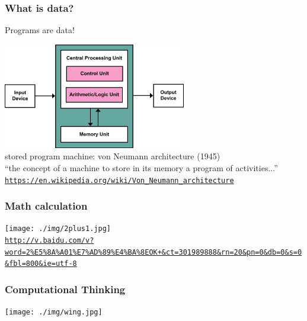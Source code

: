 \documentclass[11pt]{beamer}
\begin{document}
\begin{frame}
  \frametitle{What is data?}
  \Enlarge

  \begin{itemize}
      \myitem Programs are data! \pause
  \end{itemize}
  \begin{center}
  \includegraphics[width=0.6\textwidth]{./img/Von_Neumann.png}\\
  stored program machine: von Neumann architecture (1945)\\
  \textcolor{\CSGradBot}{``the concept of a machine to store in its memory a program of activities...''}
  \textcolor{\CSBase}{\small \texttt{\url{https://en.wikipedia.org/wiki/Von_Neumann_architecture}}}
  \end{center}
\end{frame}

\begin{frame}[fragile]
	\frametitle{Math calculation}
	\centering
	\texttt{[image: ./img/2plus1.jpg]}\\
	\textcolor{\CSBase}{\small \texttt{\url{http://v.baidu.com/v?word=2\%E5\%8A\%A01\%E7\%AD\%89\%E4\%BA\%8EOK+\&ct=301989888\&rn=20\&pn=0\&db=0\&s=0\&fbl=800\&ie=utf-8}}}
\end{frame}


\begin{frame}
	\frametitle{Computational Thinking}
	\Enlarge
	
	\texttt{[image: ./img/wing.jpg]}
\end{frame}

\end{document}
